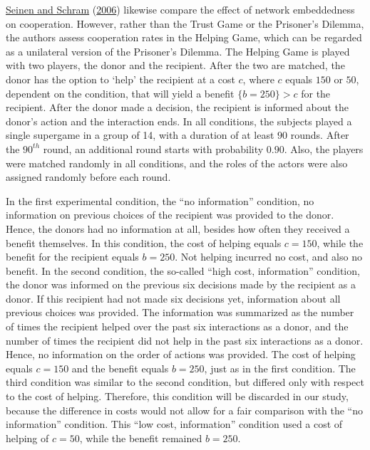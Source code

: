\documentclass[
  11pt,
]{article}
\begin{document}
\protect\hyperlink{ref-seinen_schram_social_2006}{Seinen and Schram} (\protect\hyperlink{ref-seinen_schram_social_2006}{2006}) likewise compare the effect of network embeddedness on cooperation. However, rather than the Trust Game or the Prisoner's Dilemma, the authors assess cooperation rates in the Helping Game, which can be regarded as a unilateral version of the Prisoner's Dilemma. The Helping Game is played with two players, the donor and the recipient. After the two are matched, the donor has the option to `help' the recipient at a cost \(c\), where \(c\) equals \(150\) or \(50\), dependent on the condition, that will yield a benefit \(\{b = 250\} > c\) for the recipient. After the donor made a decision, the recipient is informed about the donor's action and the interaction ends. In all conditions, the subjects played a single supergame in a group of 14, with a duration of at least \(90\) rounds. After the \(90^{th}\) round, an additional round starts with probability \(0.90\). Also, the players were matched randomly in all conditions, and the roles of the actors were also assigned randomly before each round.

In the first experimental condition, the ``no information'' condition, no information on previous choices of the recipient was provided to the donor. Hence, the donors had no information at all, besides how often they received a benefit themselves. In this condition, the cost of helping equals \(c = 150\), while the benefit for the recipient equals \(b = 250\). Not helping incurred no cost, and also no benefit. In the second condition, the so-called ``high cost, information'' condition, the donor was informed on the previous six decisions made by the recipient as a donor. If this recipient had not made six decisions yet, information about all previous choices was provided. The information was summarized as the number of times the recipient helped over the past six interactions as a donor, and the number of times the recipient did not help in the past six interactions as a donor. Hence, no information on the order of actions was provided. The cost of helping equals \(c = 150\) and the benefit equals \(b = 250\), just as in the first condition. The third condition was similar to the second condition, but differed only with respect to the cost of helping. Therefore, this condition will be discarded in our study, because the difference in costs would not allow for a fair comparison with the ``no information'' condition. This ``low cost, information'' condition used a cost of helping of \(c = 50\), while the benefit remained \(b = 250\).
\end{document}

